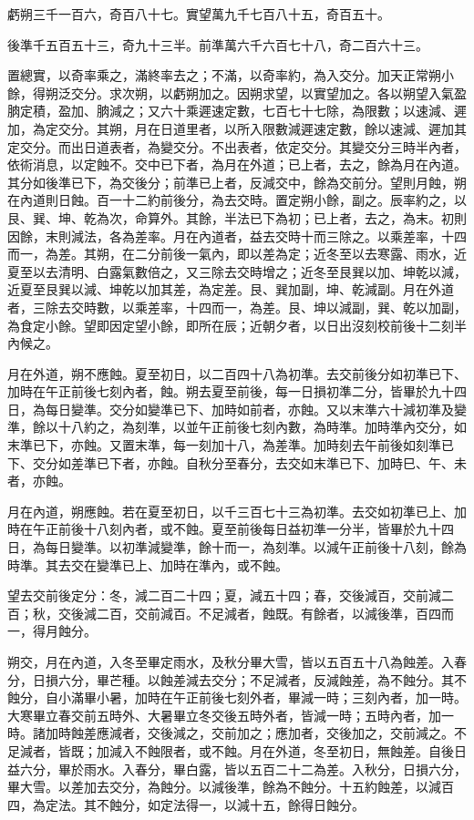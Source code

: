 \begin{pinyinscope}
 虧朔三千一百六，奇百八十七。實望萬九千七百八十五，奇百五十。



 後準千五百五十三，奇九十三半。前準萬六千六百七十八，奇二百六十三。



 置總實，以奇率乘之，滿終率去之；不滿，以奇率約，為入交分。加天正常朔小餘，得朔泛交分。求次朔，以虧朔加之。因朔求望，以實望加之。各以朔望入氣盈朒定積，盈加、朒減之；又六十乘遲速定數，七百七十七除，為限數；以速減、遲加，為定交分。其朔，月在日道里者，以所入限數減遲速定數，餘以速減、遲加其定交分。而出日道表者，為變交分。不出表者，依定交分。其變交分三時半內者，依術消息，以定蝕不。交中已下者，為月在外道；已上者，去之，餘為月在內道。其分如後準已下，為交後分；前準已上者，反減交中，餘為交前分。望則月蝕，朔在內道則日蝕。百一十二約前後分，為去交時。置定朔小餘，副之。辰率約之，以艮、巽、坤、乾為次，命算外。其餘，半法已下為初；已上者，去之，為末。初則因餘，末則減法，各為差率。月在內道者，益去交時十而三除之。以乘差率，十四而一，為差。其朔，在二分前後一氣內，即以差為定；近冬至以去寒露、雨水，近夏至以去清明、白露氣數倍之，又三除去交時增之；近冬至艮巽以加、坤乾以減，近夏至艮巽以減、坤乾以加其差，為定差。艮、巽加副，坤、乾減副。月在外道者，三除去交時數，以乘差率，十四而一，為差。艮、坤以減副，巽、乾以加副，為食定小餘。望即因定望小餘，即所在辰；近朝夕者，以日出沒刻校前後十二刻半內候之。



 月在外道，朔不應蝕。夏至初日，以二百四十八為初準。去交前後分如初準已下、加時在午正前後七刻內者，蝕。朔去夏至前後，每一日損初準二分，皆畢於九十四日，為每日變準。交分如變準已下、加時如前者，亦蝕。又以末準六十減初準及變準，餘以十八約之，為刻準，以並午正前後七刻內數，為時準。加時準內交分，如末準已下，亦蝕。又置末準，每一刻加十八，為差準。加時刻去午前後如刻準已下、交分如差準已下者，亦蝕。自秋分至春分，去交如末準已下、加時巳、午、未者，亦蝕。



 月在內道，朔應蝕。若在夏至初日，以千三百七十三為初準。去交如初準已上、加時在午正前後十八刻內者，或不蝕。夏至前後每日益初準一分半，皆畢於九十四日，為每日變準。以初準減變準，餘十而一，為刻準。以減午正前後十八刻，餘為時準。其去交在變準已上、加時在準內，或不蝕。



 望去交前後定分：冬，減二百二十四；夏，減五十四；春，交後減百，交前減二百；秋，交後減二百，交前減百。不足減者，蝕既。有餘者，以減後準，百四而一，得月蝕分。



 朔交，月在內道，入冬至畢定雨水，及秋分畢大雪，皆以五百五十八為蝕差。入春分，日損六分，畢芒種。以蝕差減去交分；不足減者，反減蝕差，為不蝕分。其不蝕分，自小滿畢小暑，加時在午正前後七刻外者，畢減一時；三刻內者，加一時。大寒畢立春交前五時外、大暑畢立冬交後五時外者，皆減一時；五時內者，加一時。諸加時蝕差應減者，交後減之，交前加之；應加者，交後加之，交前減之。不足減者，皆既；加減入不蝕限者，或不蝕。月在外道，冬至初日，無蝕差。自後日益六分，畢於雨水。入春分，畢白露，皆以五百二十二為差。入秋分，日損六分，畢大雪。以差加去交分，為蝕分。以減後準，餘為不蝕分。十五約蝕差，以減百四，為定法。其不蝕分，如定法得一，以減十五，餘得日蝕分。




\end{pinyinscope}
